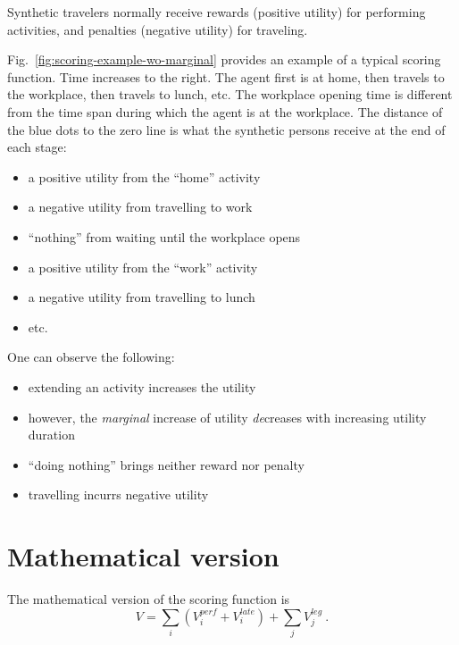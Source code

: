 Synthetic travelers normally receive rewards (positive utility) for performing activities, and penalties (negative utility) for traveling.

Fig.~\ref{fig:scoring-example-wo-marginal} provides an example of a typical scoring function.  
%
Time increases to the right. 
%
The agent first is at home, then travels to the workplace, then travels to lunch, etc.
%
The workplace opening time is different from the time span during which the agent is at the workplace.
%
The distance of the blue dots to the zero line is what the synthetic persons receive at the end of each stage:
\begin{itemize}
\item a positive utility from the ``home'' activity
\item a negative utility from travelling to work
\item ``nothing'' from waiting until the workplace opens
\item a positive utility from the ``work'' activity
\item a negative utility from travelling to lunch
\item etc.
\end{itemize}

One can observe the following:
\begin{itemize}
\item extending an activity increases the utility
\item however, the \emph{marginal} increase of utility \emph{de}creases with increasing utility duration
\item ``doing nothing'' brings neither reward nor penalty
\item travelling incurrs negative utility
\end{itemize}



\section{Mathematical version}

The mathematical version of the scoring function is
\[
V = \sum_i ( V^{perf}_i + V^{late}_i) + \sum_j V^{leg}_j \ .
\]

